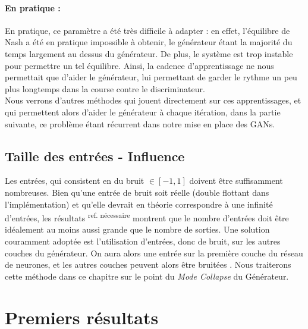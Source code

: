 \paragraph{En pratique :}
En pratique, ce paramètre a été très difficile à adapter : en effet, l'équilibre de Nash a été en pratique impossible à obtenir, le générateur étant la majorité du temps largement au dessus du générateur. De plus, le système est trop instable pour permettre un tel équilibre. Ainsi, la cadence d'apprentissage ne nous permettait que d'aider le générateur, lui permettant de garder le rythme un peu plus longtemps dans la course contre le discriminateur.\newline
\\
Nous verrons d'autres méthodes qui jouent directement sur ces apprentissages, et qui permettent alors d'aider le générateur à chaque itération, dans la partie suivante, ce problème étant récurrent dans notre mise en place des GANs.

\subsection{Taille des entrées - Influence}

Les entrées, qui consistent en du bruit $\in [-1,1]$ doivent être suffisamment nombreuses. Bien qu'une entrée de bruit soit réelle (double flottant dans l'implémentation) et qu'elle devrait en théorie correspondre à une infinité d'entrées, les résultats \textsuperscript{ref. nécessaire} montrent que le nombre d'entrées doit être idéalement au moins aussi grande que le nombre de sorties.
Une solution couramment adoptée est l'utilisation d'entrées, donc de bruit, sur les autres couches du générateur. On aura alors une entrée sur la première couche du réseau de neurones, et les autres couches peuvent alors être bruitées \cite{goodfellow_nips_2016}. Nous traiterons cette méthode dans ce chapitre sur le point du \textit{Mode Collapse} du Générateur.

\section{Premiers résultats}

